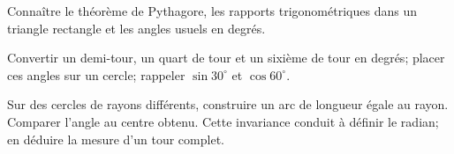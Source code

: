 \begin{prerequis}
Connaître le théorème de Pythagore, les rapports trigonométriques dans un triangle
rectangle et les angles usuels en degrés.
\end{prerequis}
\begin{automatismes}
Convertir un demi-tour, un quart de tour et un sixième de tour en degrés; placer
ces angles sur un cercle; rappeler $\sin 30^\circ$ et $\cos 60^\circ$.
\end{automatismes}
\begin{activite}
Sur des cercles de rayons différents, construire un arc de longueur égale au
rayon. Comparer l'angle au centre obtenu. Cette invariance conduit à définir le
radian; en déduire la mesure d'un tour complet.
\end{activite}

